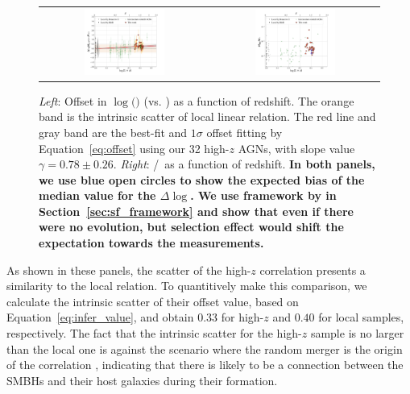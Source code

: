 \documentclass[apj]{emulateapj}
\begin{document}
\begin{figure}
\centering
\begin{tabular}{c c}
{\includegraphics[width=0.5\textwidth]{fig/MBH-Mstar-vz_style1.pdf}}&
{\includegraphics[width=0.5\textwidth]{fig/MBH-Mstar-vz_style0.pdf}}\\
\end{tabular}
\caption{\label{fig:MM-vz} 
 {\it Left}: Offset in  $\log($\mbh$)$ (vs. \smass) as a function of redshift. The orange band is the intrinsic scatter of local linear relation. The red line and gray band are the best-fit and $1\sigma$ offset fitting by Equation~\ref{eq:offset} using our 32 high-$z$ AGNs, with slope value $\gamma  = 0.78 \pm 0.26$. {\it Right}: \mbh/\smass\ as a function of redshift. {\bf In both panels, we use blue open circles to show the expected bias of the median value for the $\Delta \log$\mbh. We use framework by \citet{Schulze2011} in Section~\ref{sec:sf_framework} and show that even if there were no evolution, but selection effect would shift the expectation towards the measurements.}}
\end{figure} 

As shown in these panels, the scatter of the high-$z$ correlation presents a similarity to the local relation. To quantitively make this comparison, we calculate the intrinsic scatter of their offset value, based on Equation~\ref{eq:infer_value}, and obtain $0.33$ for high-$z$ and $0.40$ for local samples, respectively. The fact that the intrinsic scatter for the high-$z$ sample is no larger than the local one is against the scenario where the random merger is the origin of the correlation \citep{Peng2007}, indicating that there is likely to be a connection between the SMBHs and their host galaxies during their formation.
\end{document}
